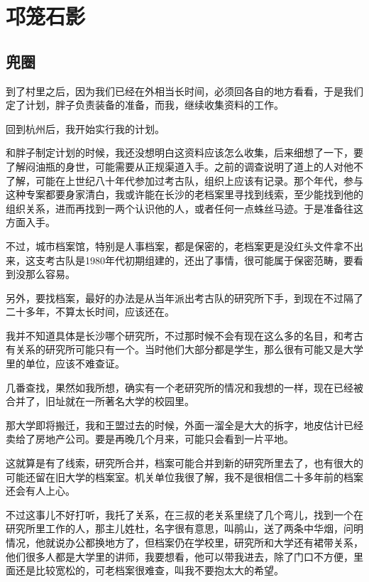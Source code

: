 \part{邛笼石影}

\chapter{兜圈}

到了村里之后，因为我们已经在外相当长时间，必须回各自的地方看看，于是我们定了计划，胖子负责装备的准备，而我，继续收集资料的工作。

回到杭州后，我开始实行我的计划。

和胖子制定计划的时候，我还没想明白这资料应该怎么收集，后来细想了一下，要了解闷油瓶的身世，可能需要从正规渠道入手。之前的调查说明了道上的人对他不了解，可能在上世纪八十年代参加过考古队，组织上应该有记录。那个年代，参与这种专案都要身家清白，我或许能在长沙的老档案里寻找到线索，至少能找到他的组织关系，进而再找到一两个认识他的人，或者任何一点蛛丝马迹。于是准备往这方面入手。

不过，城市档案馆，特别是人事档案，都是保密的，老档案更是没红头文件拿不出来，这支考古队是1980年代初期组建的，还出了事情，很可能属于保密范畴，要看到没那么容易。

另外，要找档案，最好的办法是从当年派出考古队的研究所下手，到现在不过隔了二十多年，不算太长时间，应该还在。

我并不知道具体是长沙哪个研究所，不过那时候不会有现在这么多的名目，和考古有关系的研究所可能只有一个。当时他们大部分都是学生，那么很有可能又是大学里的单位，应该不难查证。

几番查找，果然如我所想，确实有一个老研究所的情况和我想的一样，现在已经被合并了，旧址就在一所著名大学的校园里。

那大学即将搬迁，我和王盟过去的时候，外面一溜全是大大的拆字，地皮估计已经卖给了房地产公司。要是再晚几个月来，可能只会看到一片平地。

这就算是有了线索，研究所合并，档案可能合并到新的研究所里去了，也有很大的可能还留在旧大学的档案室。机关单位我很了解，我不是很相信二十多年前的档案还会有人上心。

不过这事儿不好打听，我托了关系，在三叔的老关系里绕了几个弯儿，找到一个在研究所里工作的人，那主儿姓杜，名字很有意思，叫鹃山，送了两条中华烟，问明情况，他就说办公都换地方了，但档案仍在学校里，研究所和大学还有裙带关系，他们很多人都是大学里的讲师，我要想看，他可以带我进去，除了门口不方便，里面还是比较宽松的，可老档案很难查，叫我不要抱太大的希望。

